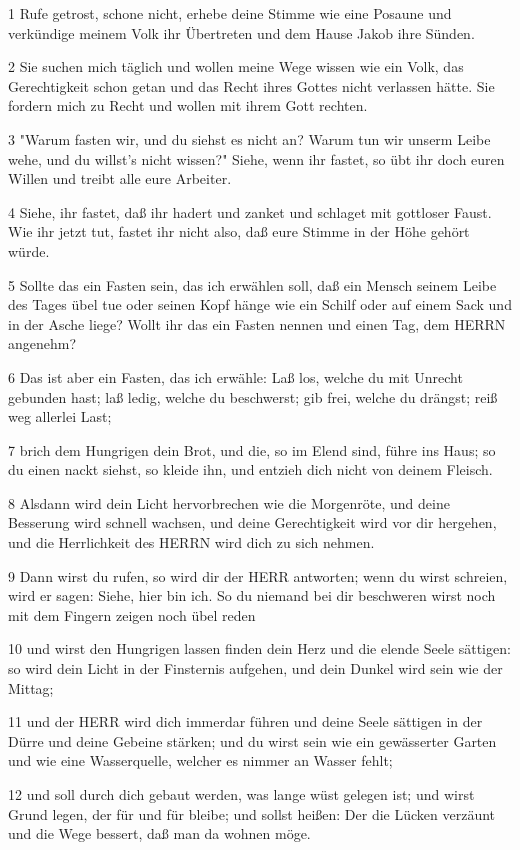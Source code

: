 \par 1 Rufe getrost, schone nicht, erhebe deine Stimme wie eine Posaune und verkündige meinem Volk ihr Übertreten und dem Hause Jakob ihre Sünden.
\par 2 Sie suchen mich täglich und wollen meine Wege wissen wie ein Volk, das Gerechtigkeit schon getan und das Recht ihres Gottes nicht verlassen hätte. Sie fordern mich zu Recht und wollen mit ihrem Gott rechten.
\par 3 "Warum fasten wir, und du siehst es nicht an? Warum tun wir unserm Leibe wehe, und du willst's nicht wissen?" Siehe, wenn ihr fastet, so übt ihr doch euren Willen und treibt alle eure Arbeiter.
\par 4 Siehe, ihr fastet, daß ihr hadert und zanket und schlaget mit gottloser Faust. Wie ihr jetzt tut, fastet ihr nicht also, daß eure Stimme in der Höhe gehört würde.
\par 5 Sollte das ein Fasten sein, das ich erwählen soll, daß ein Mensch seinem Leibe des Tages übel tue oder seinen Kopf hänge wie ein Schilf oder auf einem Sack und in der Asche liege? Wollt ihr das ein Fasten nennen und einen Tag, dem HERRN angenehm?
\par 6 Das ist aber ein Fasten, das ich erwähle: Laß los, welche du mit Unrecht gebunden hast; laß ledig, welche du beschwerst; gib frei, welche du drängst; reiß weg allerlei Last;
\par 7 brich dem Hungrigen dein Brot, und die, so im Elend sind, führe ins Haus; so du einen nackt siehst, so kleide ihn, und entzieh dich nicht von deinem Fleisch.
\par 8 Alsdann wird dein Licht hervorbrechen wie die Morgenröte, und deine Besserung wird schnell wachsen, und deine Gerechtigkeit wird vor dir hergehen, und die Herrlichkeit des HERRN wird dich zu sich nehmen.
\par 9 Dann wirst du rufen, so wird dir der HERR antworten; wenn du wirst schreien, wird er sagen: Siehe, hier bin ich. So du niemand bei dir beschweren wirst noch mit dem Fingern zeigen noch übel reden
\par 10 und wirst den Hungrigen lassen finden dein Herz und die elende Seele sättigen: so wird dein Licht in der Finsternis aufgehen, und dein Dunkel wird sein wie der Mittag;
\par 11 und der HERR wird dich immerdar führen und deine Seele sättigen in der Dürre und deine Gebeine stärken; und du wirst sein wie ein gewässerter Garten und wie eine Wasserquelle, welcher es nimmer an Wasser fehlt;
\par 12 und soll durch dich gebaut werden, was lange wüst gelegen ist; und wirst Grund legen, der für und für bleibe; und sollst heißen: Der die Lücken verzäunt und die Wege bessert, daß man da wohnen möge.
